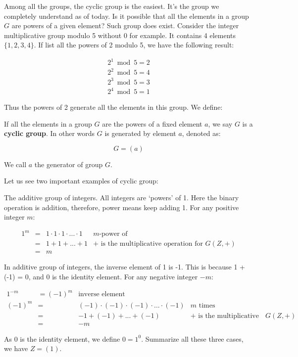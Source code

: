 \documentclass[b5paper]{article}
\begin{document}
Among all the groups, the cyclic group is the easiest. It's the group we completely understand as of today. Is it possible that all the elements in a group $G$ are powers of a given element? Such group does exist. Consider the integer multiplicative group modulo 5 without 0 for example. It contains 4 elements $\{1, 2, 3, 4\}$. If list all the powers of 2 modulo 5, we have the following result:

\[
\begin{array}{l}
2^1 \bmod 5 = 2 \\
2^2 \bmod 5 = 4 \\
2^3 \bmod 5 = 3 \\
2^4 \bmod 5 = 1
\end{array}
\]

Thus the powers of 2 generate all the elements in this group. We define:

\begin{definition}
If all the elements in a group $G$ are the powers of a fixed element $a$, we say $G$ is a \textbf{cyclic group}. In other words $G$ is generated by element $a$, denoted as:

\[
G = (a)
\]

We call $a$ the generator of group $G$.
\end{definition}

Let us see two important examples of cyclic group:

\begin{example}
The additive group of integers. All integers are `powers' of 1. Here the binary operation is addition, therefore, power means keep adding 1. For any positive integer $m$:

\[
\begin{array}{rcll}
1^m & = & 1 \cdot 1 \cdot 1 \cdot ... \cdot 1 & \text{$m$-power of} \\
    & = & 1 + 1 + ... + 1 & \text{+ is the multiplicative operation for $G(Z, +)$} \\
    & = & m &
\end{array}
\]

In additive group of integers, the inverse element of 1 is -1. This is because 1 + (-1) = 0, and 0 is the identity element. For any negative integer $-m$:

\[
\begin{array}{rcll}
1^{-m} & = (-1)^m & \text{inverse element} & \\
(-1)^m & = & (-1) \cdot (-1) \cdot (-1) \cdot ... \cdot (-1) & \text{$m$ times} \\
       & = & -1 + (-1) + ... + (-1) & \text{+ is the multiplicative operation for $G(Z, +)$} \\
       & = & -m &
\end{array}
\]

As 0 is the identity element, we define $0 = 1^0$. Summarize all these three cases, we have $Z = (1)$.
\end{example}
\end{document}
